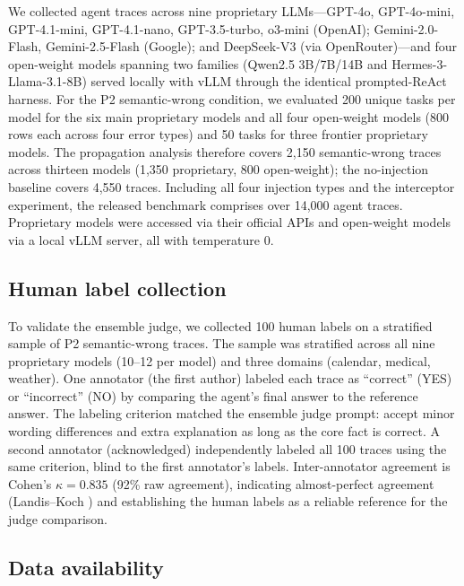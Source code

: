 \documentclass{article}
\begin{document}
We collected agent traces across nine proprietary LLMs---GPT-4o, GPT-4o-mini,
GPT-4.1-mini, GPT-4.1-nano, GPT-3.5-turbo, o3-mini (OpenAI); Gemini-2.0-Flash,
Gemini-2.5-Flash (Google); and DeepSeek-V3 (via OpenRouter)---and four
open-weight models spanning two families (Qwen2.5 3B/7B/14B and
Hermes-3-Llama-3.1-8B) served locally with vLLM through the identical
prompted-ReAct harness.
For the P2 semantic-wrong condition, we evaluated 200 unique tasks per model for
the six main proprietary models and all four open-weight models (800 rows each
across four error types) and 50 tasks for three frontier proprietary models. The
propagation analysis therefore covers 2{,}150 semantic-wrong traces across
thirteen models (1{,}350 proprietary, 800 open-weight); the no-injection
baseline covers 4{,}550 traces. Including all four injection types and the
interceptor experiment, the released benchmark comprises over 14{,}000 agent
traces.
Proprietary models were accessed via their official APIs and open-weight models
via a local vLLM server, all with temperature 0.

\subsection{Human label collection}

To validate the ensemble judge, we collected 100 human labels on a
stratified sample of P2 semantic-wrong traces.
The sample was stratified across all nine proprietary models (10--12 per model)
and three domains (calendar, medical, weather).
One annotator (the first author) labeled each trace as ``correct''
(YES) or ``incorrect'' (NO) by comparing the agent's final answer to
the reference answer.
The labeling criterion matched the ensemble judge prompt: accept minor
wording differences and extra explanation as long as the core fact is
correct.
A second annotator (acknowledged) independently labeled all 100 traces using
the same criterion, blind to the first annotator's labels. Inter-annotator
agreement is Cohen's $\kappa{=}0.835$ (92\% raw agreement), indicating
almost-perfect agreement (Landis--Koch \citep{landis1977kappa}) and establishing
the human labels as a reliable reference for the judge comparison.

\subsection{Data availability}
\end{document}
